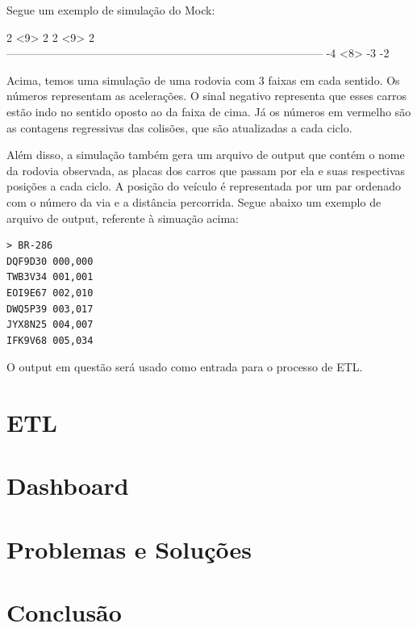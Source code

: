 \documentclass{article}
\def\openesc{\color{red}}
\def\closeesc{\color{black}}
\def\vbdelim{\catcode`<=\active\catcode`>=\active%
\def<{\openesc}
\def>{\closeesc}}
\begin{document}
    Segue um exemplo de simulação do Mock:

    \begin{verbnobox}[\vbdelim]
2                                                     <9>                                                                                                           2                                                                                                                                        
 2                                                        <9>                 
                               2                                            
------------------------------------------------------------------------------------
                                                 -4                         
                                                 <8>                        -3         
             -2
    \end{verbnobox}
    
    Acima, temos uma simulação de uma rodovia com 3 faixas em cada sentido. Os números representam
    as acelerações. O sinal negativo representa que esses carros estão indo no sentido oposto ao
    da faixa de cima. Já os números em vermelho são as contagens regressivas das colisões, que são
    atualizadas a cada ciclo.

    Além disso, a simulação também gera um arquivo de output que contém o nome da rodovia observada,
    as placas dos carros que passam por ela e suas respectivas posições a cada ciclo. A posição do
    veículo é representada por um par ordenado com o número da via e a distância percorrida.
    Segue abaixo um exemplo de arquivo de output, referente à simuação acima:

    \begin{verbatim}
> BR-286
DQF9D30 000,000
TWB3V34 001,001
EOI9E67 002,010
DWQ5P39 003,017
JYX8N25 004,007
IFK9V68 005,034
    \end{verbatim}

    O output em questão será usado como entrada para o processo de ETL.

    \section{ETL}

    \section{Dashboard}

    \section{Problemas e Soluções}

    \section{Conclusão}
\end{document}
